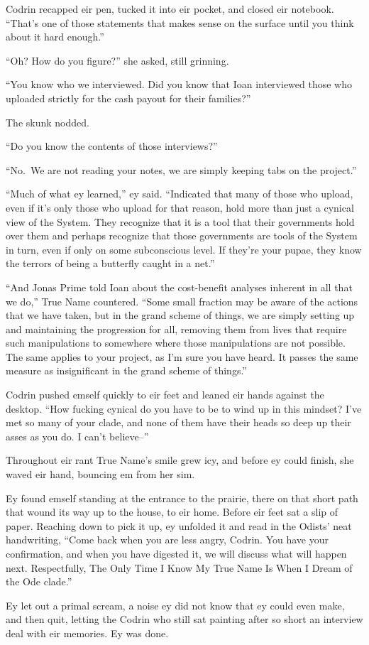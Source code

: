 Codrin recapped eir pen, tucked it into eir pocket, and closed eir notebook. ``That's one of those statements that makes sense on the surface until you think about it hard enough.''

``Oh? How do you figure?'' she asked, still grinning.

``You know who we interviewed. Did you know that Ioan interviewed those who uploaded strictly for the cash payout for their families?''

The skunk nodded.

``Do you know the contents of those interviews?''

``No.~We are not reading your notes, we are simply keeping tabs on the project.''

``Much of what ey learned,'' ey said. ``Indicated that many of those who upload, even if it's only those who upload for that reason, hold more than just a cynical view of the System. They recognize that it is a tool that their governments hold over them and perhaps recognize that those governments are tools of the System in turn, even if only on some subconscious level. If they're your pupae, they know the terrors of being a butterfly caught in a net.''

``And Jonas Prime told Ioan about the cost-benefit analyses inherent in all that we do,'' True Name countered. ``Some small fraction may be aware of the actions that we have taken, but in the grand scheme of things, we are simply setting up and maintaining the progression for all, removing them from lives that require such manipulations to somewhere where those manipulations are not possible. The same applies to your project, as I'm sure you have heard. It passes the same measure as insignificant in the grand scheme of things.''

Codrin pushed emself quickly to eir feet and leaned eir hands against the desktop. ``How fucking cynical do you have to be to wind up in this mindset? I've met so many of your clade, and none of them have their heads so deep up their asses as you do. I can't believe--''

Throughout eir rant True Name's smile grew icy, and before ey could finish, she waved eir hand, bouncing em from her sim.

Ey found emself standing at the entrance to the prairie, there on that short path that wound its way up to the house, to eir home. Before eir feet sat a slip of paper. Reaching down to pick it up, ey unfolded it and read in the Odists' neat handwriting, ``Come back when you are less angry, Codrin. You have your confirmation, and when you have digested it, we will discuss what will happen next. Respectfully, The Only Time I Know My True Name Is When I Dream of the Ode clade.''

Ey let out a primal scream, a noise ey did not know that ey could even make, and then quit, letting the Codrin who still sat painting after so short an interview deal with eir memories. Ey was done.
